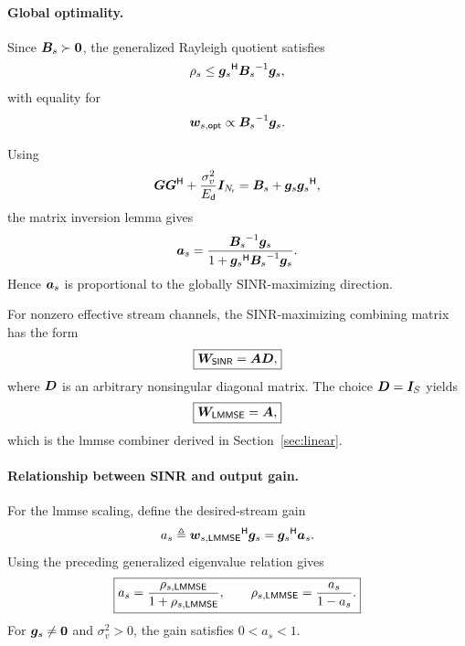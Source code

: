 \paragraph{Global optimality.}
Since $\bm{B}_s\succ\bm{0}$,
the generalized Rayleigh quotient satisfies
\begin{equation*}
	\rho_s
	\leq
	{\bm{g}_s}^{\mathsf{H}}{\bm{B}_s}^{-1}\bm{g}_s,
\end{equation*}
with equality for
\begin{equation*}
	\bm{w}_{s,\mathsf{opt}}
	\propto{\bm{B}_s}^{-1}\bm{g}_s.
\end{equation*}

Using
\begin{equation*}
	\bm{G}{\bm{G}}^{\mathsf{H}}
	+\frac{\sigma_v^2}{E_{\mathsf{d}}}\bm{I}_{N_{\mathsf{r}}}
	=\bm{B}_s+\bm{g}_s{\bm{g}_s}^{\mathsf{H}},
\end{equation*}
the matrix inversion lemma gives
\begin{equation*}
	\bm{a}_s
	=
	\frac{
		{\bm{B}_s}^{-1}\bm{g}_s
	}{
		1+{\bm{g}_s}^{\mathsf{H}}{\bm{B}_s}^{-1}\bm{g}_s
	}.
\end{equation*}
Hence $\bm{a}_s$ is proportional to the globally
SINR-maximizing direction.

For nonzero effective stream channels, the
SINR-maximizing combining matrix has the form
\begin{equation}\label{eq:app-sinr-combiner}
	\boxed{
		\bm{W}_{\mathsf{SINR}}=\bm{A}\bm{D},
	}
\end{equation}
where $\bm{D}$ is an arbitrary nonsingular diagonal
matrix. The choice $\bm{D}=\bm{I}_{S}$ yields
\begin{equation*}
	\boxed{
		\bm{W}_{\mathsf{LMMSE}}=\bm{A},
	}
\end{equation*}
which is the \ac{lmmse} combiner derived in
Section~\ref{sec:linear}.

\paragraph{Relationship between SINR and output gain.}
For the \ac{lmmse} scaling, define the
desired-stream gain
\begin{equation*}
	a_s\triangleq
	{\bm{w}_{s,\mathsf{LMMSE}}}^{\mathsf{H}}\bm{g}_s
	={\bm{g}_s}^{\mathsf{H}}\bm{a}_s.
\end{equation*}
Using the preceding generalized eigenvalue
relation gives
\begin{equation}\label{eq:app-sinr-gain}
	\boxed{
		a_s
		=\frac{\rho_{s,\mathsf{LMMSE}}}
		{1+\rho_{s,\mathsf{LMMSE}}},
		\qquad
		\rho_{s,\mathsf{LMMSE}}
		=\frac{a_s}{1-a_s}.
	}
\end{equation}
For $\bm{g}_s\neq\bm{0}$ and $\sigma_v^2>0$,
the gain satisfies $0<a_s<1$.

